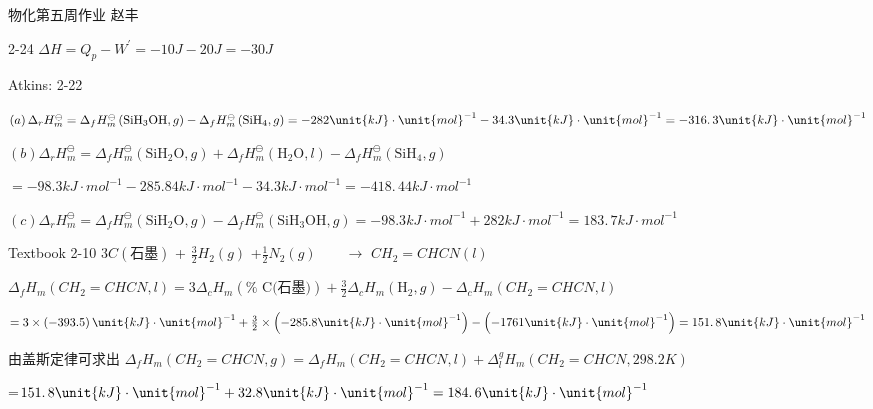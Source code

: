 \documentclass{article}
\begin{document}
\bigskip 物化第五周作业\qquad 
赵丰

2-24 $\Delta H=Q_{p}-W^{\prime }=-10\unit{J}-20\unit{J}=-30\unit{J}$

Atkins: 2-22

$\left( a\right) \Delta _{r}H_{m}^{\ominus }=\Delta _{f}H_{m}^{\ominus
}\left( \text{SiH}_{3}\text{OH},g\right) -\Delta _{f}H_{m}^{\ominus }\left( 
\text{SiH}_{4},g\right) =-282\unit{kJ}\cdot \unit{mol}^{-1}-34.3\unit{kJ}%
\cdot \unit{mol}^{-1}=\allowbreak -316.\,\allowbreak 3\unit{kJ}\cdot \unit{%
mol}^{-1}$

$\left( b\right) \Delta _{r}H_{m}^{\ominus }=\Delta _{f}H_{m}^{\ominus
}\left( \text{SiH}_{2}\text{O},g\right) +\Delta _{f}H_{m}^{\ominus }\left( 
\text{H}_{2}\text{O},l\right) -\Delta _{f}H_{m}^{\ominus }\left( \text{SiH}%
_{4},g\right) $

$=-98.3\unit{kJ}\cdot \unit{mol}^{-1}-285.84\unit{kJ}\cdot \unit{mol}%
^{-1}-34.3\unit{kJ}\cdot \unit{mol}^{-1}=\allowbreak -418.\,\allowbreak 44%
\unit{kJ}\cdot \unit{mol}^{-1}$

$\left( c\right) \Delta _{r}H_{m}^{\ominus }=\Delta _{f}H_{m}^{\ominus
}\left( \text{SiH}_{2}\text{O},g\right) -\Delta _{f}H_{m}^{\ominus }\left( 
\text{SiH}_{3}\text{OH},g\right) =-98.3\unit{kJ}\cdot \unit{mol}^{-1}+282%
\unit{kJ}\cdot \unit{mol}^{-1}=\allowbreak 183.\,\allowbreak 7\unit{kJ}\cdot 
\unit{mol}^{-1}$

Textbook 2-10 $3C\left( \text{石墨}\right) $ + $\frac{3}{2}%
H_{2}\left( g\right) $ +$\frac{1}{2}N_{2}\left( g\right) \qquad \rightarrow $
$CH_{2}=CHCN\left( l\right) \qquad $

$\Delta _{f}H_{m}\left( CH_{2}=CHCN,l\right) =3\Delta _{c}H_{m}\left( \text{%
C(石墨)}\right) +\frac{3}{2}\Delta _{c}H_{m}\left( \text{H}%
_{2},g\right) -\Delta _{c}H_{m}\left( CH_{2}=CHCN,l\right) $

$=3\times \left( -393.5\right) \unit{kJ}\cdot \unit{mol}^{-1}+\frac{3}{2}%
\times \left( -285.8\unit{kJ}\cdot \unit{mol}^{-1}\right) -\left( -1761\unit{%
kJ}\cdot \unit{mol}^{-1}\right) =\allowbreak 151.\,\allowbreak 8\unit{kJ}%
\cdot \unit{mol}^{-1}$

\bigskip 由盖斯定律可求出%
\qquad $\Delta _{f}H_{m}\left( CH_{2}=CHCN,g\right) =\Delta _{f}H_{m}\left(
CH_{2}=CHCN,l\right) +\Delta _{l}^{g}H_{m}\left( CH_{2}=CHCN,298.2\unit{K}%
\right) $

=$151.\,\allowbreak 8\unit{kJ}\cdot \unit{mol}^{-1}+32.8\unit{kJ}\cdot \unit{%
mol}^{-1}=\allowbreak 184.\,\allowbreak 6\unit{kJ}\cdot \unit{mol}^{-1}$
\end{document}
